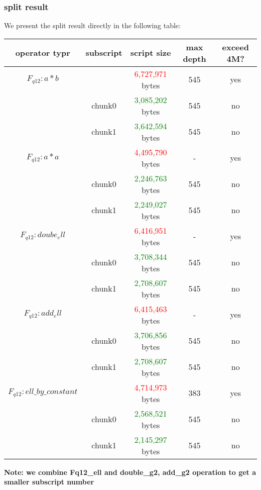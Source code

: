 \subsubsection{split result}

We present the split result directly in the following table:

\begin{center}
\begin{tabular}{|c|c|c|c|c|} \hline
    operator typr & subscript & script size & max depth & exceed 4M? \\ \hline
    $F_{q12}: a * b$ & & \textcolor{red}{6,727,971} bytes & 545 & yes \\ \hline
     & chunk0 & \textcolor{green}{ 3,085,202 } bytes & 545 & no \\ \hline
     & chunk1 & \textcolor{green}{ 3,642,594} bytes & 545 & no \\ \hline
    $F_{q12}: a * a$ & & \textcolor{red}{4,495,790} bytes & - & yes \\ \hline
    & chunk0 & \textcolor{green}{2,246,763} bytes & 545 & no \\ \hline
    & chunk1 & \textcolor{green}{2,249,027} bytes & 545 & no \\ \hline
    $F_{q12}: doube_ell $ & & \textcolor{red}{6,416,951} bytes & - & yes \\ \hline
    & chunk0 & \textcolor{green}{3,708,344} bytes & 545 & no \\ \hline
    & chunk1 & \textcolor{green}{2,708,607} bytes & 545 & no \\ \hline
    $F_{q12}: add_ell $ & & \textcolor{red}{6,415,463} bytes & - & yes \\ \hline
    & chunk0 & \textcolor{green}{3,706,856} bytes & 545 & no \\ \hline
    & chunk1 & \textcolor{green}{2,708,607} bytes & 545 & no \\ \hline
    $F_{q12}: ell\_by\_constant$ & & \textcolor{red}{4,714,973} bytes & 383 & yes \\ \hline
    & chunk0 & \textcolor{green}{2,568,521} bytes & 545 & no \\ \hline
    & chunk1 & \textcolor{green}{2,145,297} bytes & 545 & no \\ \hline
\end{tabular}
\end{center}

\textbf{Note: we combine Fq12\_ell and double\_g2, add\_g2 operation to get a smaller subscript number}
